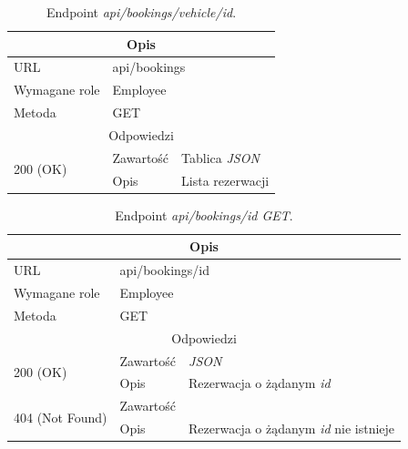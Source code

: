 \documentclass[eng,printmode,openany]{mgr}
\begin{document}
	\begin{table}[H]
		\caption{Endpoint \textit{api/bookings/vehicle/id}.}
		\begin{tabularx}{\textwidth}{|l|l|X|}
			\hline
			\multicolumn{3}{|c|}{Opis}
			\\ \hline
			URL                         & \multicolumn{2}{l|}{api/bookings}
			\\ \hline
			Wymagane role               & \multicolumn{2}{l|}{Employee}
			\\ \hline
			Metoda                      & \multicolumn{2}{l|}{GET}
			\\ \hline
			\multicolumn{3}{|c|}{ Odpowiedzi}
			\\ \hline
			\multirow{2}{*}{200 (OK)}   & Zawartość         & Tablica \textit{JSON}
			\\ \cline{2-3}              & Opis         	    & Lista rezerwacji
			\\ \hline
		\end{tabularx}
	\end{table}
	
	\begin{table}[H]
		\caption{Endpoint \textit{api/bookings/id GET}.}
		\begin{tabularx}{\textwidth}{|l|l|X|}
			\hline
			\multicolumn{3}{|c|}{Opis}
			\\ \hline
			URL                         & \multicolumn{2}{l|}{api/bookings/id}
			\\ \hline
			Wymagane role               & \multicolumn{2}{l|}{Employee}
			\\ \hline
			Metoda                      & \multicolumn{2}{l|}{GET}
			\\ \hline
			\multicolumn{3}{|c|}{Odpowiedzi}
			\\ \hline
			\multirow{2}{*}{200 (OK)} 	        & Zawartość   	& \textit{JSON}
			\\ \cline{2-3}                      & Opis         	& Rezerwacja o żądanym \textit{id}
			\\ \hline
			\multirow{2}{*}{404 (Not Found)} 	& Zawartość     & 
			\\ \cline{2-3}                      & Opis          & Rezerwacja o żądanym \textit{id} nie istnieje
			\\ \hline
		\end{tabularx}
	\end{table}
	
\end{document}
